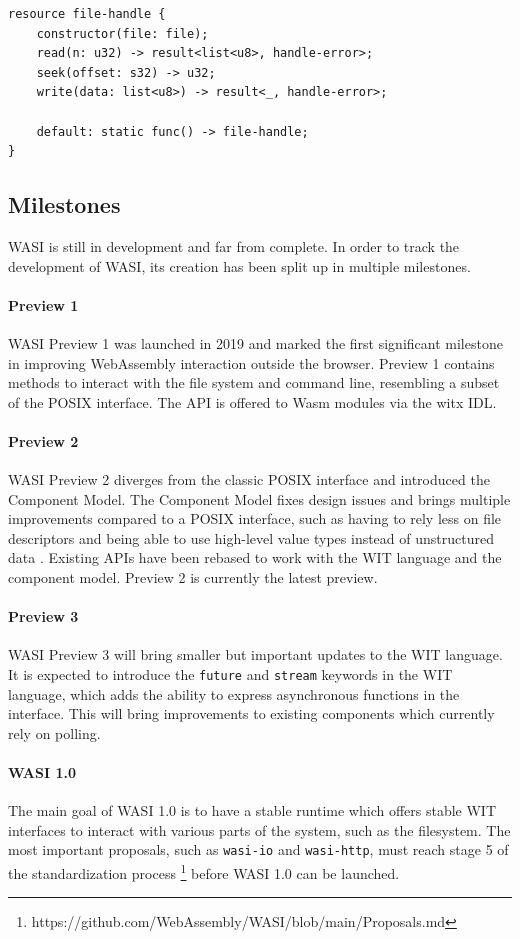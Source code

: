  
\begin{lstlisting}[language=wit]
resource file-handle {
    constructor(file: file);
    read(n: u32) -> result<list<u8>, handle-error>;
    seek(offset: s32) -> u32;
    write(data: list<u8>) -> result<_, handle-error>;
    
    default: static func() -> file-handle;
}
\end{lstlisting}


\subsection{Milestones}
\acrshort{WASI} is still in development and far from complete. In order to track the development of WASI, its creation has been split up in multiple milestones.

\paragraph{Preview 1}
\acrshort{WASI} Preview 1 was launched in 2019 and marked the first significant milestone in improving WebAssembly interaction outside the browser. Preview 1 contains methods to interact with the file system and command line, resembling a subset of the \acrfull{POSIX} interface. The API is offered to \acrshort{Wasm} modules via the witx \acrfull{IDL}.

\paragraph{Preview 2}
\acrshort{WASI} Preview 2 diverges from the classic \acrshort{POSIX} interface and introduced the Component Model. The Component Model fixes design issues and brings multiple improvements compared to a \acrshort{POSIX} interface, such as having to rely less on file descriptors and being able to use high-level value types instead of unstructured data \cite{path_to_components}. Existing APIs have been rebased to work with the \acrshort{WIT} language and the component model. Preview 2 is currently the latest preview.

\paragraph{Preview 3}
\acrshort{WASI} Preview 3 will bring smaller but important updates to the \acrshort{WIT} language. It is expected to introduce the \texttt{future} and \texttt{stream} keywords in the \acrshort{WIT} language, which adds the ability to express asynchronous functions in the interface. This will bring improvements to existing components which currently rely on polling.

\paragraph{WASI 1.0}
The main goal of \acrshort{WASI} 1.0 is to have a stable runtime which offers stable WIT interfaces to interact with various parts of the system, such as the filesystem. The most important proposals, such as \texttt{wasi-io} and \texttt{wasi-http}, must reach stage 5 of the standardization process \footnote{https://github.com/WebAssembly/WASI/blob/main/Proposals.md} before WASI 1.0 can be launched. 
